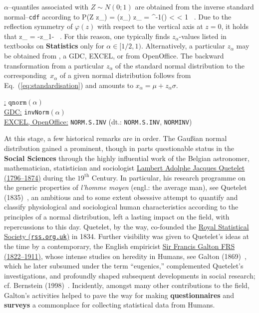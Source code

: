 \medskip
\noindent
$\alpha$--quantiles associated with $Z \sim N(0;1)$ are obtained
from the inverse standard normal--\texttt{cdf} according to
%
\be
\alpha \stackrel{!}{=} P(Z \leq z_{\alpha}) = \Phi(z_{\alpha})
\qquad\Leftrightarrow\qquad
z_{\alpha} = \Phi^{-1}(\alpha)
\quad{} < \alpha < 1 \ .
\ee
%
Due to the reflection symmetry of $\varphi(z)$ with respect to the
vertical axis at $z=0$, it holds that
%
\be
z_{\alpha} = -z_{1-\alpha} \ .
\ee
%
For this reason, one typically finds $z_{\alpha}$-values listed in 
textbooks on \textbf{Statistics} only for $\alpha \in [1/2,1)$. 
Alternatively, a particular $z_{\alpha}$ may be obtained from \R,
a GDC, EXCEL, or from OpenOffice. The backward transformation from
a particular $z_{\alpha}$ of the standard normal distribution to
the corresponding~$x_{\alpha}$ of a given normal distribution
follows from Eq.~(\ref{eq:standardisation}) and amounts to
$x_{\alpha} = \mu+z_{\alpha}\sigma$.

\medskip
\noindent
\underline{\R:} $\texttt{qnorm}(\alpha)$ \\
\underline{GDC:} \texttt{invNorm}$(\alpha)$ \\
\underline{EXCEL, OpenOffice:} \texttt{NORM.S.INV} (dt.:
\texttt{NORM.S.INV}, \texttt{NORMINV})

\vspace{5mm}
\noindent
At this stage, a few historical remarks are in order. The
Gau\ss ian normal distribution gained a prominent, though in 
parts questionable status in the \textbf{Social Sciences} through
the highly influential work of the Belgian astronomer, 
mathematician, statistician and sociologist 
\href{http://www-history.mcs.st-and.ac.uk/Biographies/Quetelet.html}{Lambert Adolphe Jacques Quetelet (1796--1874)} during the 
$19^\mathrm{th}$ Century. In particular, his research programme on 
the generic properties of \textit{l'homme moyen} (engl.: the
average man), see Quetelet (1835)~, an ambitious and to
some extent obsessive attempt to quantify and classify
physiological and sociological human characteristics according to
the principles of a normal distribution, left a lasting impact on
the field, with repercussions to this day. Quetelet, by the way,
co-founded the \href{http://www.rss.org.uk}{Royal Statistical
Society (\texttt{rss.org.uk})} in 1834. Further visibility was
given to Quetelet's ideas at the time by a contemporary, the
English empiricist 
\href{http://www-history.mcs.st-and.ac.uk/Biographies/Galton.html}{Sir Francis Galton FRS (1822--1911)}, whose intense studies on 
heredity in Humans, see Galton (1869)~, which he later 
subsumed under the term ``eugenics,'' complemented Quetelet's 
investigations, and profoundly shaped subsequent developments in 
social research; cf. Bernstein (1998)~. 
Incidently, amongst many other contributions to the field, 
Galton's activities helped to pave the way for making
\textbf{questionnaires} and \textbf{surveys} a commonplace for
collecting statistical data from Humans.

